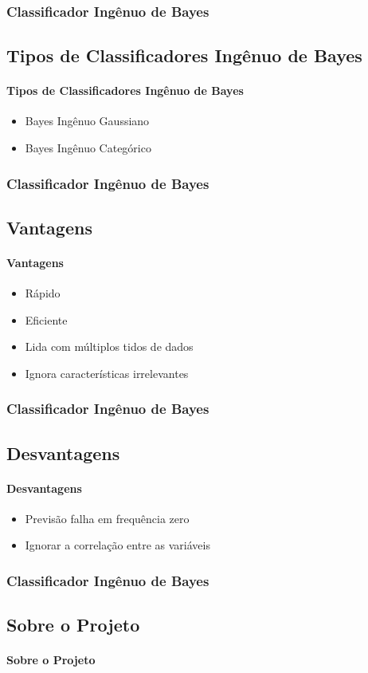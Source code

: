 \documentclass{beamer}
\begin{document}
\begin{frame}
\frametitle{Classificador Ingênuo de Bayes}
\subsection{Tipos de Classificadores Ingênuo de Bayes}
\framesubtitle{Tipos de Classificadores Ingênuo de Bayes}
\begin{itemize}
\item Bayes Ingênuo Gaussiano
\item Bayes Ingênuo Categórico
\end{itemize}
\end{frame}

\begin{frame}
    \frametitle{Classificador Ingênuo de Bayes}
    \subsection{Vantagens}
    \framesubtitle{Vantagens}
    \begin{itemize}
    \item Rápido
    \item Eficiente
    \item Lida com múltiplos tidos de dados
    \item Ignora características irrelevantes
    
    \end{itemize}
    \end{frame}
    \begin{frame}
    \frametitle{Classificador Ingênuo de Bayes}
    \subsection{Desvantagens}
    \framesubtitle{Desvantagens}
    \begin{itemize}
    \item Previsão falha em frequência zero
    \item Ignorar a correlação entre as variáveis
    \end{itemize}
    \end{frame}

\begin{frame}
\frametitle{Classificador Ingênuo de Bayes}
\subsection{Sobre o Projeto}
\framesubtitle{Sobre o Projeto}
 
\end{frame}
\end{document}
